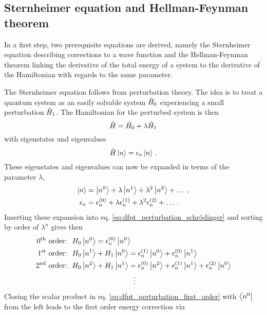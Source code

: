 \documentclass[main.tex]{subfiles}
\begin{document}
\subsection{Sternheimer equation and Hellman-Feynman theorem}

In a first step, two prerequisite equations are derived, namely the Sternheimer equation describing corrections to a wave function and the Hellman-Feynman theorem linking the derivative of the total energy of a system to the derivative of the Hamiltonian with regards to the same parameter.

The Sternheimer equation follows from perturbation theory.
The idea is to treat a quantum system as an easily solvable system \(\hat{H}_0\) experiencing a small perturbation \(\hat{H}_1\).
The Hamiltonian for the perturbed system is then
\begin{equation}
    \hat{H} = \hat{H}_0 + \lambda \hat{H}_1
\end{equation}
with eigenstates und eigenvalues
\begin{equation}\label{eq:dfpt_perturbation_schrödinger}
    \hat{H} \ket{n} = \epsilon_n \ket{n}\,.
\end{equation}
These eigenstates and eigenvalues can now be expanded in terms of the parameter \(\lambda\),
\begin{align}
    \ket{n} &= \ket{n^{0}} + \lambda \ket{n^{1}} + \lambda^2 \ket{n^{2}} + \ldots\,, \\
    \epsilon_n &= \epsilon_n^{(0)} + \lambda \epsilon_n^{(1)} + \lambda^2 \epsilon_n^{(2)} + \ldots\,.
\end{align}
Inserting these expansion into eq. \ref{eq:dfpt_perturbation_schrödinger} and sorting by order of \(\lambda^n\) gives then
\begin{align}
    \text{0\textsuperscript{th} order: }\; &H_0 \ket{n^{0}} = \epsilon_n^{(0)} \ket{n^{0}} \\ 
    \text{1\textsuperscript{st} order: }\; &H_0 \ket{n^{1}} + H_1 \ket{n^{0}} = \epsilon_n^{(1)} \ket{n^{0}} + \epsilon_n^{(0)} \ket{n^{1}} \label{eq:dfpt_perturbation_first_order} \\
    \text{2\textsuperscript{nd} order: }\; &H_0 \ket{n^{2}} + H_1 \ket{n^{1}} = \epsilon_n^{(0)} \ket{n^{2}} + \epsilon_n^{(1)} \ket{n^{1}} + \epsilon_n^{(2)} \ket{n^{0}} \\
    &\hspace{3cm} \vdots \nonumber
\end{align}
Closing the scalar product in eq. \ref{eq:dfpt_perturbation_first_order} with \(\bra{n^{0}}\) from the left leads to the first order energy correction via
\end{document}
